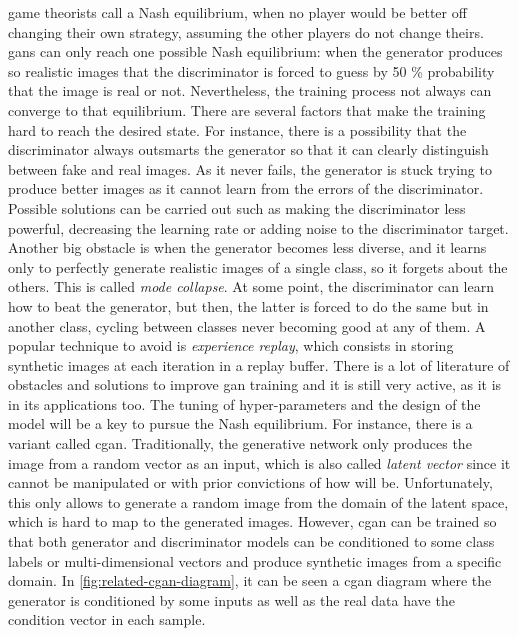\documentclass[../main.tex]{subfiles}
\begin{document}
game theorists call a Nash equilibrium, when no player would be better off changing their own strategy, assuming the other players do not change theirs. \gls{gan}s can only reach one possible Nash equilibrium: when the generator produces so realistic images that the discriminator is forced to guess by 50 \% probability that the image is real or not. Nevertheless, the training process not always can converge to that equilibrium. There are several factors that make the training hard to reach the desired state. For instance, there is a possibility that the discriminator always outsmarts the generator so that it can clearly distinguish between fake and real images. As it never fails, the generator is stuck trying to produce better images as it cannot learn from the errors of the discriminator. Possible solutions can be carried out such as making the discriminator less powerful, decreasing the learning rate or adding noise to the discriminator target. Another big obstacle is when the generator becomes less diverse, and it learns only to perfectly generate realistic images of a single class, so it forgets about the others. This is  called \textit{mode collapse}. At some point, the discriminator can learn how to beat the generator, but then, the latter is forced to do the same but in another class, cycling between classes never becoming good at any of them. A popular technique to avoid is \textit{experience replay}, which consists in storing synthetic images at each iteration in a replay buffer. There is a lot of literature of obstacles and solutions to improve \gls{gan} training and it is still very active, as it is in its applications too. The tuning of hyper-parameters and the design of the model will be a key to pursue the Nash equilibrium. For instance, there is a variant called \gls{cgan}. Traditionally, the generative network only produces the image from a random vector as an input, which is also called \textit{latent vector} since it cannot be manipulated or with prior convictions of how will be. Unfortunately, this only allows to generate a random image from the domain of the latent space, which is hard to map to the generated images. However, \gls{cgan} can be trained so that both generator and discriminator models can be conditioned to some class labels or multi-dimensional vectors and produce synthetic images from a specific domain. In \ref{fig:related-cgan-diagram}, it can be seen a \gls{cgan} diagram where the generator is conditioned by some inputs as well as the real data have the condition vector in each sample.
\end{document}
